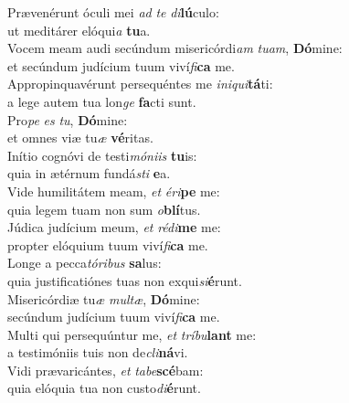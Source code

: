 \evenverse Prævenérunt óculi mei \textit{ad} \textit{te} \textit{di}\textbf{lú}culo:~\*\\
\evenverse ut meditárer elóqui\textit{a} \textbf{tu}a.\\
\oddverse Vocem meam audi secúndum misericórdi\textit{am} \textit{tu}\textit{am}, \textbf{Dó}mine:~\*\\
\oddverse et secúndum judícium tuum viví\textit{fi}\textbf{ca} me.\\
\evenverse Appropinquavérunt persequéntes me \textit{i}\textit{ni}\textit{qui}\textbf{tá}ti:~\*\\
\evenverse a lege autem tua lon\textit{ge} \textbf{fa}cti sunt.\\
\oddverse Pro\textit{pe} \textit{es} \textit{tu}, \textbf{Dó}mine:~\*\\
\oddverse et omnes viæ tu\textit{æ} \textbf{vé}ritas.\\
\evenverse Inítio cognóvi de testi\textit{mó}\textit{ni}\textit{is} \textbf{tu}is:~\*\\
\evenverse quia in ætérnum fundá\textit{sti} \textbf{e}a.\\
\oddverse Vide humilitátem meam, \textit{et} \textit{é}\textit{ri}\textbf{pe} me:~\*\\
\oddverse quia legem tuam non sum \textit{o}\textbf{blí}tus.\\
\evenverse Júdica judícium meum, \textit{et} \textit{ré}\textit{di}\textbf{me} me:~\*\\
\evenverse propter elóquium tuum viví\textit{fi}\textbf{ca} me.\\
\oddverse Longe a pecca\textit{tó}\textit{ri}\textit{bus} \textbf{sa}lus:~\*\\
\oddverse quia justificatiónes tuas non exqui\textit{si}\textbf{é}runt.\\
\evenverse Misericórdiæ tu\textit{æ} \textit{mul}\textit{tæ}, \textbf{Dó}mine:~\*\\
\evenverse secúndum judícium tuum viví\textit{fi}\textbf{ca} me.\\
\oddverse Multi qui persequúntur me, \textit{et} \textit{trí}\textit{bu}\textbf{lant} me:~\*\\
\oddverse a testimóniis tuis non de\textit{cli}\textbf{ná}vi.\\
\evenverse Vidi prævaricántes, \textit{et} \textit{ta}\textit{be}\textbf{scé}bam:~\*\\
\evenverse quia elóquia tua non custo\textit{di}\textbf{é}runt.\\
